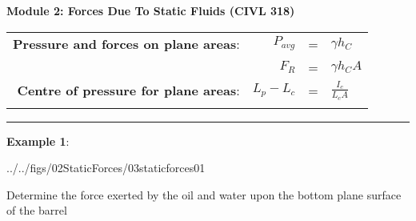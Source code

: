 \documentclass[10pt,onesided]{amsart}
\begin{document}
\thispagestyle{empty}
\vspace{-7cm}
\centering

\textbf{\Large Module 2: Forces Due To Static Fluids (CIVL 318)}
\parb
\begin{center}
	\begin{tabular}{rrcl}
		\toprule
		\addlinespace
		\textbf{Pressure and forces on plane areas}: & $P_{avg}$ & = & $\gamma{h_C}$      \\
		\addlinespace
		                                             & $F_R$     & = & $\gamma{h_C}A$     \\
		\addlinespace
		\midrule
		\addlinespace
		\textbf{Centre of pressure for plane areas}: & $L_p-L_c$ & = & $\frac{I_c}{L_cA}$ \\
		\addlinespace
		\bottomrule
	\end{tabular}
\end{center}



\rule{\columnwidth}{0.02in}
\parb
\raggedright

\begin{minipage}{0.35\columnwidth}
	\raggedright
	\textbf{Example 1}:
	\begin{cfig}[0.4]{../../figs/02StaticForces/03staticforces01}\end{cfig}
	Determine the force exerted by the oil and water upon the bottom plane surface of the barrel
\end{minipage}

\newpage
\end{document}
